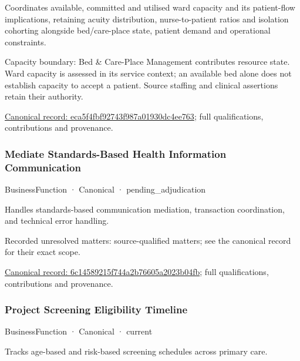 Coordinates available, committed and utilised ward capacity and its patient-flow implications, retaining acuity distribution, nurse-to-patient ratios and isolation cohorting alongside bed/care-place state, patient demand and operational constraints.



Capacity boundary: Bed \& Care-Place Management contributes resource state. Ward capacity is assessed in its service context; an available bed alone does not establish capacity to accept a patient. Source staffing and clinical assertions retain their authority.


{\footnotesize \href{../../../../continuum/business/business-function/eca5f4fbf92743f987a01930dc4ee763.md}{Canonical record: eca5f4fbf92743f987a01930dc4ee763}; full qualifications, contributions and provenance.}\par
\subsubsection{Mediate Standards-Based Health Information Communication}

\label{element:6c14589215f744a2b76605a2023b04fb}
{\small BusinessFunction · Canonical · pending\_adjudication}\par

Handles standards-based communication mediation, transaction coordination, and technical error handling.


{\small Recorded unresolved matters: source-qualified matters; see the canonical record for their exact scope.}\par
{\footnotesize \href{../../../../continuum/business/business-function/6c14589215f744a2b76605a2023b04fb.md}{Canonical record: 6c14589215f744a2b76605a2023b04fb}; full qualifications, contributions and provenance.}\par
\subsubsection{Project Screening Eligibility Timeline}

\label{element:afb08bdb99cd41d3a86ef7bf7ad5e92d}
{\small BusinessFunction · Canonical · current}\par

Tracks age-based and risk-based screening schedules across primary care.



